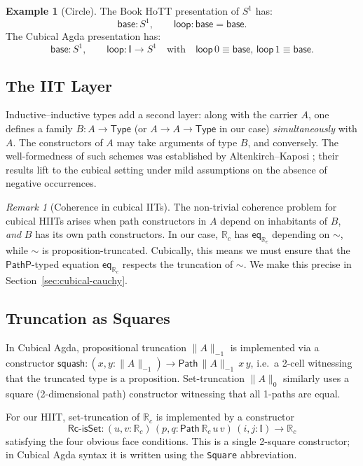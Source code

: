 \documentclass[12pt]{article}
\theoremstyle{definition}
\newtheorem{example}[theorem]{Example}
\theoremstyle{remark}
\newtheorem{remark}[theorem]{Remark}
\newcommand{\Type}{\mathsf{Type}}
\newcommand{\Rc}{\mathbb{R}_{c}}
\newcommand{\Path}{\mathsf{Path}}
\newcommand{\PathP}{\mathsf{PathP}}
\newcommand{\II}{\mathbb{I}}
\newcommand{\close}{\mathrel{\sim}}
\begin{document}
\begin{example}[Circle]
The Book HoTT presentation of $S^1$ has:
\[
\mathsf{base} : S^1, \qquad \mathsf{loop} : \mathsf{base} = \mathsf{base}.
\]
The Cubical Agda presentation has:
\[
\mathsf{base} : S^1, \qquad
\mathsf{loop} : \II \to S^1
\quad \text{with}\quad \mathsf{loop}\,0 \equiv \mathsf{base},\,
\mathsf{loop}\,1 \equiv \mathsf{base}.
\]
\end{example}

\subsection{The IIT Layer}

Inductive--inductive types add a second layer: along with the carrier $A$,
one defines a family $B : A \to \Type$ (or $A \to A \to \Type$ in our
case) \emph{simultaneously} with $A$. The constructors of $A$ may take
arguments of type $B$, and conversely. The well-formedness of such
schemes was established by Altenkirch--Kaposi
\cite{AltenkirchKaposi}; their results lift to the cubical setting under
mild assumptions on the absence of negative occurrences.

\begin{remark}[Coherence in cubical IITs]
\label{rem:coherence}
The non-trivial coherence problem for cubical HIITs arises when path
constructors in $A$ depend on inhabitants of $B$, \emph{and}
$B$ has its own path constructors. In our case, $\Rc$ has
$\mathsf{eq}_{\Rc}$ depending on $\close$, while $\close$ is
proposition-truncated. Cubically, this means we must ensure that the
$\PathP$-typed equation $\mathsf{eq}_{\Rc}$ respects the truncation of
$\close$. We make this precise in Section~\ref{sec:cubical-cauchy}.
\end{remark}

\subsection{Truncation as Squares}

In Cubical Agda, propositional truncation $\| A \|_{-1}$ is implemented
via a constructor
$\mathsf{squash} : (x, y : \| A \|_{-1}) \to \Path\,\| A \|_{-1}\,x\,y$,
i.e.\ a 2-cell witnessing that the truncated type is a proposition.
Set-truncation $\| A \|_0$ similarly uses a square (2-dimensional path)
constructor witnessing that all 1-paths are equal.

For our HIIT, set-truncation of $\Rc$ is implemented by a constructor
\[
\mathsf{Rc\text{-}isSet} :
(u, v : \Rc)\,(p, q : \Path\,\Rc\,u\,v)\,(i, j : \II) \to \Rc
\]
satisfying the four obvious face conditions. This is a single
2-square constructor; in Cubical Agda syntax it is written using the
\texttt{Square} abbreviation.
\end{document}
